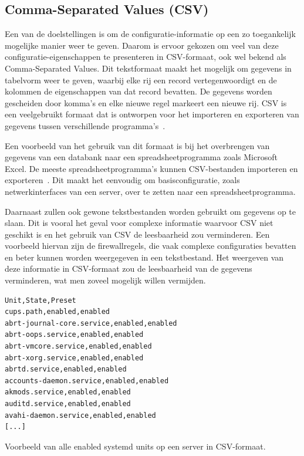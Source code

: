 \subsection{Comma-Separated Values (CSV)}
\label{poc_functionaliteiten_csv}

Een van de doelstellingen is om de configuratie-informatie op een zo toegankelijk mogelijke manier weer te geven.
Daarom is ervoor gekozen om veel van deze configuratie-eigenschappen te presenteren in CSV-formaat, ook wel bekend als Comma-Separated Values.
Dit tekstformaat maakt het mogelijk om gegevens in tabelvorm weer te geven, waarbij elke rij een record vertegenwoordigt en de kolommen de eigenschappen van dat record bevatten.
De gegevens worden gescheiden door komma's en elke nieuwe regel markeert een nieuwe rij.
CSV is een veelgebruikt formaat dat is ontworpen voor het importeren en exporteren van gegevens tussen verschillende programma's~\autocite{shafranovich2005common}.

Een voorbeeld van het gebruik van dit formaat is bij het overbrengen van gegevens van een databank naar een spreadsheetprogramma zoals Microsoft Excel.
De meeste spreadsheetprogramma's kunnen CSV-bestanden importeren en exporteren~\autocite{shafranovich2005common}.
Dit maakt het eenvoudig om basisconfiguratie, zoals netwerkinterfaces van een server, over te zetten naar een spreadsheetprogramma.

Daarnaast zullen ook gewone tekstbestanden worden gebruikt om gegevens op te slaan.
Dit is vooral het geval voor complexe informatie waarvoor CSV niet geschikt is en het gebruik van CSV de leesbaarheid zou verminderen.
Een voorbeeld hiervan zijn de firewallregels, die vaak complexe configuraties bevatten en beter kunnen worden weergegeven in een tekstbestand.
Het weergeven van deze informatie in CSV-formaat zou de leesbaarheid van de gegevens verminderen, wat men zoveel mogelijk willen vermijden.

\begin{listing}
  \begin{verbatim}
Unit,State,Preset
cups.path,enabled,enabled
abrt-journal-core.service,enabled,enabled
abrt-oops.service,enabled,enabled
abrt-vmcore.service,enabled,enabled
abrt-xorg.service,enabled,enabled
abrtd.service,enabled,enabled
accounts-daemon.service,enabled,enabled
akmods.service,enabled,enabled
auditd.service,enabled,enabled
avahi-daemon.service,enabled,enabled
[...]
  \end{verbatim}
  \caption[Enabled systemd units in CSV-formaat.]{Voorbeeld van alle enabled systemd units op een server in CSV-formaat.}
  \label{lst:poc-network-csv}
\end{listing}

